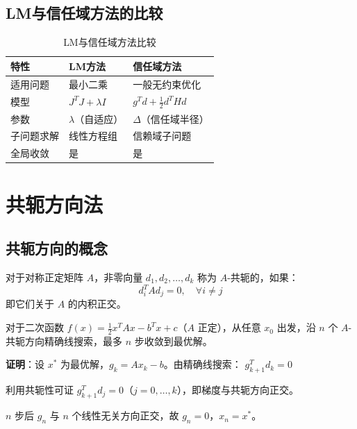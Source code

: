 \subsection{LM与信任域方法的比较}

\begin{table}[H]
\centering
\caption{LM与信任域方法比较}
\begin{tabular}{@{}lll@{}}
\toprule
\textbf{特性} & \textbf{LM方法} & \textbf{信任域方法} \\
\midrule
适用问题 & 最小二乘 & 一般无约束优化 \\
模型 & $J^T J + \lambda I$ & $g^T d + \frac{1}{2}d^T H d$ \\
参数 & $\lambda$（自适应） & $\Delta$（信任域半径） \\
子问题求解 & 线性方程组 & 信赖域子问题 \\
全局收敛 & 是 & 是 \\
\bottomrule
\end{tabular}
\end{table}

\section{共轭方向法}\label{sec:conjugate}

\subsection{共轭方向的概念}\label{sec:conjugate-def}

\begin{conceptbox}[共轭方向]
对于对称正定矩阵 $A$，非零向量 $d_1, d_2, \ldots, d_k$ 称为 $A$-共轭的，如果：
\[
d_i^T A d_j = 0, \quad \forall i \neq j
\]
即它们关于 $A$ 的内积正交。
\end{conceptbox}

\begin{theorem}[共轭方向法的有限步收敛]
对于二次函数 $f(x) = \frac{1}{2}x^T A x - b^T x + c$（$A$ 正定），从任意 $x_0$ 出发，沿 $n$ 个 $A$-共轭方向精确线搜索，最多 $n$ 步收敛到最优解。
\end{theorem}

\textbf{证明}：设 $x^*$ 为最优解，$g_k = Ax_k - b$。由精确线搜索：
$g_{k+1}^T d_k = 0$

利用共轭性可证 $g_{k+1}^T d_j = 0$（$j = 0, \ldots, k$），即梯度与共轭方向正交。

$n$ 步后 $g_n$ 与 $n$ 个线性无关方向正交，故 $g_n = 0$，$x_n = x^*$。

